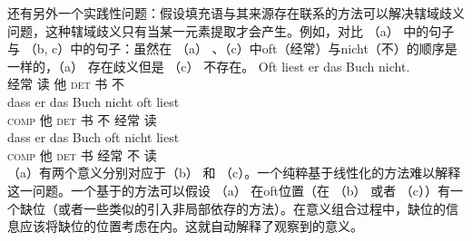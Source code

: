 还有另外一个实践性问题：假设填充语与其来源存在联系的方法可以解决辖域歧义问题，这种辖域歧义只有当某一元素提取才会产生。例如，对比 （a） 中的句子与 （b, c）中的句子：虽然在 （a） 、（c）中oft（经常）与nicht（不）的顺序是一样的，（a） 存在歧义但是 （c） 不存在。
\eal
\ex 
\gll Oft liest er das Buch nicht.\\
     经常 读 他 \textsc{det} 书 不\\
\ex
\gll dass er das Buch nicht oft liest\\
     \textsc{comp} 他 \textsc{det} 书 不 经常 读\\
\ex
\gll dass er das Buch oft nicht liest\\
     \textsc{comp} 他 \textsc{det} 书 经常 不 读\\
\zl
（a）有两个意义分别对应于（b） 和 （c）。一个纯粹基于线性化的方法难以解释这一问题。一个基于\slaschc 的方法可以假设 （a） 在oft位置（在 （b） 或者 （c））有一个缺位（或者一些类似的引入非局部依存的方法）。在意义组合过程中，缺位的信息应该将缺位的位置考虑在内。这就自动解释了观察到的意义。

